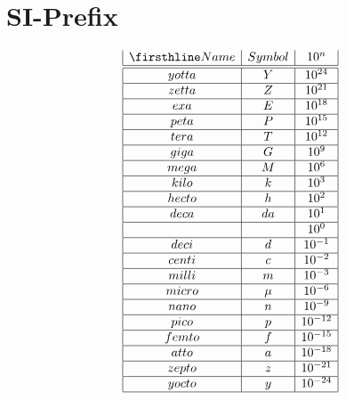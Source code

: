 \section{SI-Prefix}

\[
\begin{array}{|c|c|c|}
\firsthline
Name    & Symbol & 10^{n}  \\
\hline
\hline
yotta 	& Y	& 10^{24}	 \\ \hline
zetta	& Z	& 10^{21}	 \\ \hline
exa	& E	& 10^{18}	 \\ \hline
peta	& P	& 10^{15}	 \\ \hline
tera	& T	& 10^{12}	 \\ \hline
giga	& G	& 10^{9}	 \\ \hline
mega	& M	& 10^{6}	 \\ \hline
kilo	& k	& 10^{3}	 \\ \hline
hecto	& h	& 10^{2}	 \\ \hline
deca	& da	& 10^{1}	 \\ \hline
	&    	& 10^{0}	 \\ \hline
deci	& d  	& 10^{-1}	 \\ \hline
centi	& c  	& 10^{-2}	 \\ \hline
milli	& m  	& 10^{-3}	 \\ \hline
micro	& \mu 	& 10^{-6}	 \\ \hline
nano	& n	& 10^{-9} 	 \\ \hline
pico	& p	& 10^{-12}	 \\ \hline
femto	& f	& 10^{-15}	 \\ \hline
atto	& a	& 10^{-18}	 \\ \hline
zepto	& z	& 10^{-21}	 \\ \hline
yocto	& y	& 10^{-24}	 \\ \hline
\end{array}
\]
